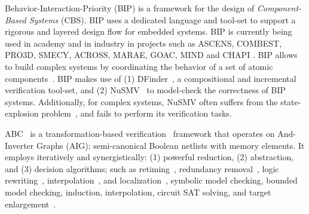 %
Behavior-Interaction-Priority (BIP) is a framework for the design of 
{\em Component-Based Systems} (CBS). 
BIP uses a dedicated language and tool-set to support a rigorous 
and layered design flow for embedded systems. 
BIP is currently being used in academy and in industry in projects such as 
ASCENS, COMBEST, PRO3D, SMECY, ACROSS, MARAE, GOAC, MIND and CHAPI \cite{bipwebsite}. 
BIP allows to build complex systems by coordinating the behavior of a set of 
atomic components~\cite{bip11}.
BIP makes use of (1) DFinder~\cite{dfinder}, a compositional  
and incremental verification tool-set, and (2) NuSMV~\cite{nusmv}
to model-check the correctness of BIP systems. 
Additionally, for complex systems, NuSMV often suffers from the state-explosion problem~\cite{sipser2006introduction}, and fails to perform its verification tasks.

ABC~\cite{brayton2010abc} is a transformation-based 
verification~\cite{KuBa01} framework that operates on 
And-Inverter Graphs (AIG); semi-canonical Boolean netlists with
memory elements. It employs iteratively and synergistically: (1) powerful reduction, (2) abstraction, and (3) decision algorithms; such as
retiming~\cite{KuBa01}, 
redundancy removal~\cite{HmBPK05,KuMP01,BjesseC00,aziz-fmsd-00}, 
logic rewriting~\cite{BjBo04}, interpolation~\cite{McMillan03}, 
and localization~\cite{Wang03}, 
symbolic model checking, bounded model checking, induction, 
interpolation, circuit SAT solving, 
and target enlargement~\cite{MoGS00,MoMZ01,HoSH00,BaKuAb02,Hari05expert}.

